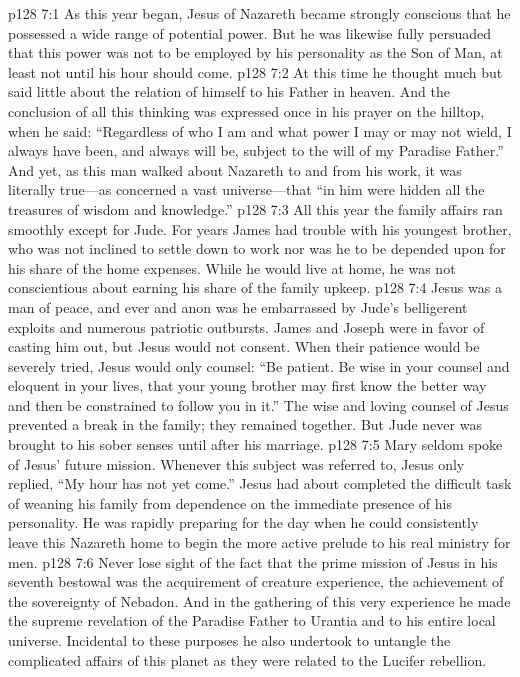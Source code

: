 \vs p128 7:1 As this year began, Jesus of Nazareth became strongly conscious that he possessed a wide range of potential power. But he was likewise fully persuaded that this power was not to be employed by his personality as the Son of Man, at least not until his hour should come.
\vs p128 7:2 At this time he thought much but said little about the relation of himself to his Father in heaven. And the conclusion of all this thinking was expressed once in his prayer on the hilltop, when he said: \textcolor{ubdarkred}{“Regardless of who I am and what power I may or may not wield, I always have been, and always will be, subject to the will of my Paradise Father.”} And yet, as this man walked about Nazareth to and from his work, it was literally true---as concerned a vast universe---that “in him were hidden all the treasures of wisdom and knowledge.”
\pc \vs p128 7:3 All this year the family affairs ran smoothly except for Jude. For years James had trouble with his youngest brother, who was not inclined to settle down to work nor was he to be depended upon for his share of the home expenses. While he would live at home, he was not conscientious about earning his share of the family upkeep.
\vs p128 7:4 Jesus was a man of peace, and ever and anon was he embarrassed by Jude’s belligerent exploits and numerous patriotic outbursts. James and Joseph were in favor of casting him out, but Jesus would not consent. When their patience would be severely tried, Jesus would only counsel: \textcolor{ubdarkred}{“Be patient. Be wise in your counsel and eloquent in your lives, that your young brother may first know the better way and then be constrained to follow you in it.”} The wise and loving counsel of Jesus prevented a break in the family; they remained together. But Jude never was brought to his sober senses until after his marriage.
\vs p128 7:5 Mary seldom spoke of Jesus’ future mission. Whenever this subject was referred to, Jesus only replied, \textcolor{ubdarkred}{“My hour has not yet come.”} Jesus had about completed the difficult task of weaning his family from dependence on the immediate presence of his personality. He was rapidly preparing for the day when he could consistently leave this Nazareth home to begin the more active prelude to his real ministry for men.
\vs p128 7:6 Never lose sight of the fact that the prime mission of Jesus in his seventh bestowal was the acquirement of creature experience, the achievement of the sovereignty of Nebadon. And in the gathering of this very experience he made the supreme revelation of the Paradise Father to Urantia and to his entire local universe. Incidental to these purposes he also undertook to untangle the complicated affairs of this planet as they were related to the Lucifer rebellion.
